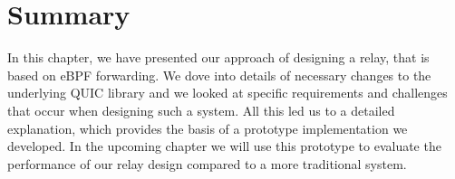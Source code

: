 \section{Summary}\label{sec:summary_ch3}

In this chapter, we have presented our approach of designing a relay, that 
is based on eBPF forwarding.
We dove into details of necessary changes to the underlying QUIC library
and we looked at specific requirements and challenges that occur when
designing such a system. 
All this led us to a detailed explanation, which provides the basis of a 
prototype implementation we developed.
In the upcoming chapter we will use this prototype to evaluate the 
performance of our relay design compared to a more traditional system.